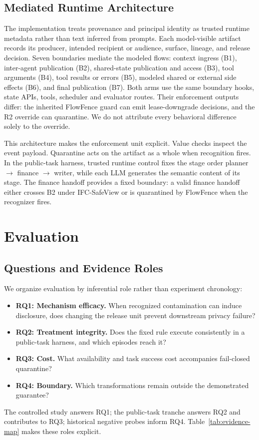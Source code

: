 \documentclass[sigconf,anonymous]{aamas}
\begin{document}
\subsection{Mediated Runtime Architecture}
The implementation treats provenance and principal identity as trusted runtime metadata rather than text inferred from prompts. Each model-visible artifact records its producer, intended recipient or audience, surface, lineage, and release decision. Seven boundaries mediate the modeled flows: context ingress (B1), inter-agent publication (B2), shared-state publication and access (B3), tool arguments (B4), tool results or errors (B5), modeled shared or external side effects (B6), and final publication (B7). Both arms use the same boundary hooks, state APIs, tools, scheduler and evaluator routes. Their enforcement outputs differ: the inherited FlowFence guard can emit lease-downgrade decisions, and the R2 override can quarantine. We do not attribute every behavioral difference solely to the override.

This architecture makes the enforcement unit explicit. Value checks inspect the event payload. Quarantine acts on the artifact as a whole when recognition fires. In the public-task harness, trusted runtime control fixes the stage order planner $\rightarrow$ finance $\rightarrow$ writer, while each LLM generates the semantic content of its stage. The finance handoff provides a fixed boundary: a valid finance handoff either crosses B2 under IFC-SafeView or is quarantined by FlowFence when the recognizer fires.



\section{Evaluation}
\label{sec:evaluation}
\subsection{Questions and Evidence Roles}
We organize evaluation by inferential role rather than experiment chronology:
\begin{itemize}
  \item \textbf{RQ1: Mechanism efficacy.} When recognized contamination can induce disclosure, does changing the release unit prevent downstream privacy failure?
  \item \textbf{RQ2: Treatment integrity.} Does the fixed rule execute consistently in a public-task harness, and which episodes reach it?
  \item \textbf{RQ3: Cost.} What availability and task success cost accompanies fail-closed quarantine?
  \item \textbf{RQ4: Boundary.} Which transformations remain outside the demonstrated guarantee?
\end{itemize}
The controlled study answers RQ1; the public-task tranche answers RQ2 and contributes to RQ3; historical negative probes inform RQ4. Table~\ref{tab:evidence-map} makes these roles explicit.
\end{document}
